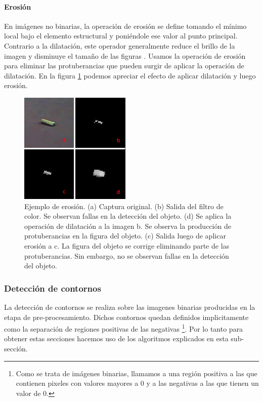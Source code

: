 	\paragraph{Erosi\'on}
En imágenes no binarias, la operación de erosión se define tomando el mínimo local bajo el elemento estructural y poniéndole ese valor al punto principal. Contrario a la dilatación, este operador generalmente reduce el brillo de la imagen y disminuye el tamaño de las figuras \cite{nasa-dilate-erode}. Usamos la operación de erosión para eliminar las protuberancias que pueden surgir de aplicar la operación de dilatación. En la figura \ref{fig:erode} podemos apreciar el efecto de aplicar dilatación y luego erosión.

\begin{figure}[tpb]
\begin{center}
  \includegraphics[scale=0.8]{figuras/erosion.png}
\end{center}
  \caption{\small Ejemplo de erosión. (a) Captura original. (b) Salida del filtro de color. Se observan fallas en la detección del objeto. (d) Se aplica la operación de dilatación a la imagen b. Se observa la producción de protuberancias en la figura del objeto. (c) Salida luego de aplicar erosión a c. La figura del objeto se corrige eliminando parte de las protuberancias. Sin embargo, no se observan fallas en la detección del objeto. }
  \label{fig:erode}
\end{figure}

	\subsubsection{Detección de contornos}
	La detección de contornos se realiza sobre las imagenes binarias producidas en la etapa de pre-procesamiento. Dichos contornos
	quedan definidos implicitamente como la separación de regiones 
	positivas de las negativas \footnote{ Como se trata de imágenes 
	binarias, llamamos a una región positiva a las que contienen 
	pixeles con valores mayores a 0 y a las negativas a las que tienen 
	un valor de 0.}. Por lo tanto para obtener estas secciones hacemos 
	uso de los algoritmos explicados en esta sub-sección.
	
